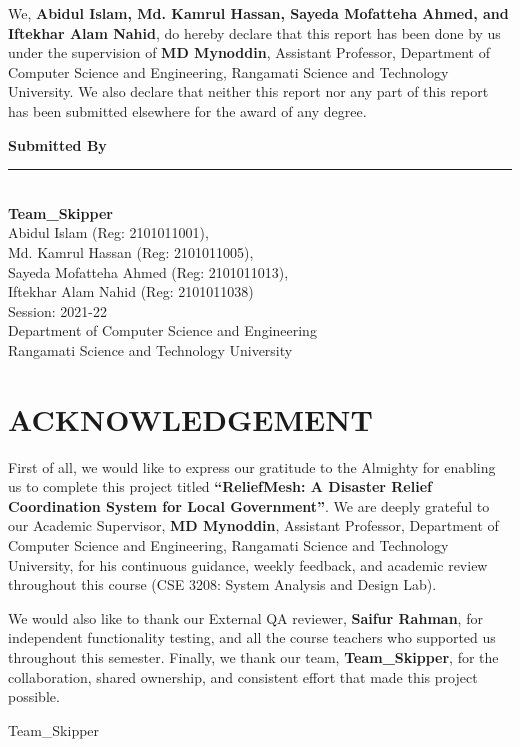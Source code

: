 \documentclass[11pt,a4paper]{report}
\newcommand{\thesistitle}{ReliefMesh: A Disaster Relief Coordination System for Local Government}
\begin{document}
We, \textbf{Abidul Islam, Md. Kamrul Hassan, Sayeda Mofatteha Ahmed, and Iftekhar Alam Nahid}, do hereby declare that this report has been done by us under the supervision of \textbf{MD Mynoddin}, Assistant Professor, Department of Computer Science and Engineering, Rangamati Science and Technology University. We also declare that neither this report nor any part of this report has been submitted elsewhere for the award of any degree.

\vspace{1.5cm}
\noindent\textbf{Submitted By}

\vspace{0.6cm}
\noindent\rule{6cm}{0.4pt}\\
\textbf{Team\_Skipper}\\
Abidul Islam (Reg: 2101011001),\\
Md. Kamrul Hassan (Reg: 2101011005),\\
Sayeda Mofatteha Ahmed (Reg: 2101011013),\\
Iftekhar Alam Nahid (Reg: 2101011038)\\
Session: 2021-22\\
Department of Computer Science and Engineering\\
Rangamati Science and Technology University

\chapter*{ACKNOWLEDGEMENT}
\thispagestyle{empty}

First of all, we would like to express our gratitude to the Almighty for enabling us to complete this project titled \textbf{``\thesistitle''}. We are deeply grateful to our Academic Supervisor, \textbf{MD Mynoddin}, Assistant Professor, Department of Computer Science and Engineering, Rangamati Science and Technology University, for his continuous guidance, weekly feedback, and academic review throughout this course (CSE 3208: System Analysis and Design Lab).

We would also like to thank our External QA reviewer, \textbf{Saifur Rahman}, for independent functionality testing, and all the course teachers who supported us throughout this semester. Finally, we thank our team, \textbf{Team\_Skipper}, for the collaboration, shared ownership, and consistent effort that made this project possible.

\vspace{1cm}
\hfill Team\_Skipper
\clearpage
\end{document}
